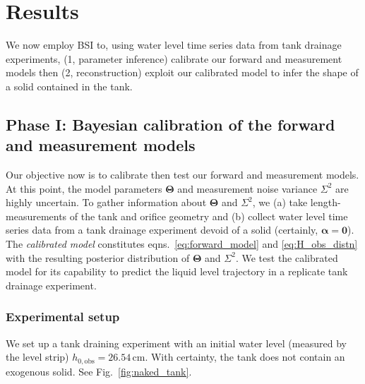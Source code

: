 \documentclass[openacc]{rsproca_new}%
\begin{document}
\section{Results}
We now employ BSI to, using water level time series data from tank drainage experiments,  
(1, parameter inference) calibrate our forward and measurement models then
(2, reconstruction) exploit our calibrated model to infer the shape of a solid contained in the tank.

\subsection{Phase I: Bayesian calibration of the forward and measurement models}
\label{sec:phaseI}
Our objective now is to calibrate then test our forward and measurement models.
At this point, the model parameters $\boldsymbol \Theta$ and measurement noise variance $\Sigma^2$ are highly uncertain.
To gather information about $\boldsymbol \Theta$ and $\Sigma^2$, we (a) take length-measurements of the tank and orifice geometry and (b) collect water level time series data from a tank drainage experiment devoid of a solid (certainly, $\boldsymbol \alpha = \mathbf{0}$).
The \emph{calibrated model} constitutes eqns.~\ref{eq:forward_model} and \ref{eq:H_obs_distn} with the resulting posterior distribution of $\boldsymbol \Theta$ and $\Sigma^2$. We test the calibrated model for its capability to predict the liquid level trajectory in a replicate tank drainage experiment.


\subsubsection{Experimental setup}
We set up a tank draining experiment with an initial water level (measured by the level strip) $h_{0, \text{obs}}=26.54$\,cm. 
With certainty, the tank does not contain an exogenous solid. See Fig.~\ref{fig:naked_tank}.
\end{document}
